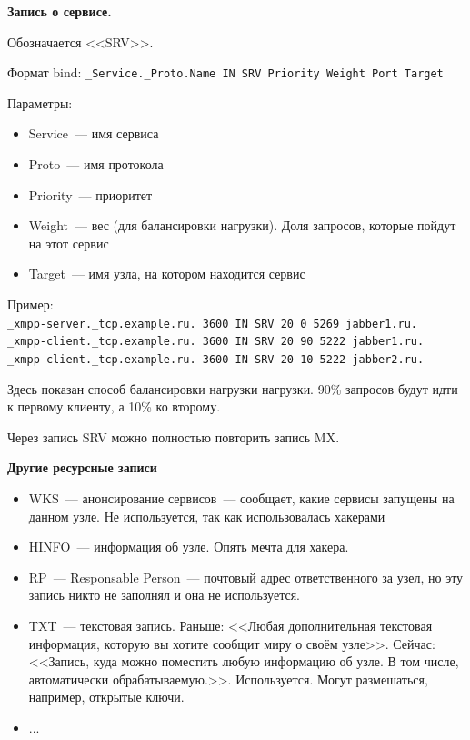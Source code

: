 {\bf Запись о сервисе.}

Обозначается <<SRV>>.

Формат bind: {\tt \_Service.\_Proto.Name IN SRV Priority Weight Port Target}

Параметры:
\begin{itemize}
    \item Service~--- имя сервиса
    \item Proto~--- имя протокола
    \item Priority~--- приоритет
    \item Weight~--- вес (для балансировки нагрузки). Доля запросов, которые пойдут на этот сервис
    \item Target~--- имя узла, на котором находится сервис
\end{itemize}

Пример:\\
{\tt \_xmpp-server.\_tcp.example.ru. 3600 IN SRV 20 0 5269 jabber1.ru.}\\
{\tt \_xmpp-client.\_tcp.example.ru. 3600 IN SRV 20 90 5222 jabber1.ru.}\\
{\tt \_xmpp-client.\_tcp.example.ru. 3600 IN SRV 20 10 5222 jabber2.ru.}

Здесь показан способ балансировки нагрузки нагрузки. 90\% запросов будут идти к первому клиенту, а 10\% ко второму.

Через запись SRV можно полностью повторить запись MX.

{\bf Другие ресурсные записи}
\begin{itemize}
    \item WKS~--- анонсирование сервисов~--- сообщает, какие сервисы запущены на данном узле. Не используется, так как использовалась хакерами
    \item HINFO~--- информация об узле. Опять мечта для хакера.
    \item RP~--- Responsable Person~--- почтовый адрес ответственного за узел, но эту запись никто не заполнял и она не используется.
    \item TXT~--- текстовая запись. Раньше: <<Любая дополнительная текстовая информация, которую вы хотите сообщит миру о своём узле>>. Сейчас: <<Запись, куда можно поместить любую информацию об узле. В том числе, автоматически обрабатываемую.>>. Используется. Могут размешаться, например, открытые ключи.
    \item ...
\end{itemize}


